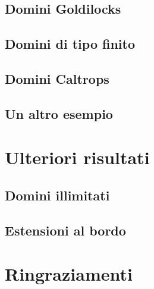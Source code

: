 \documentclass{article}
\begin{document}
\subsection{Domini Goldilocks}

\subsection{Domini di tipo finito}

\subsection{Domini Caltrops}

\subsection{Un altro esempio}


\newpage

\section{Ulteriori risultati} \label{Ulteriori risultati}
\subsection{Domini illimitati}

\subsection{Estensioni al bordo}


\newpage



\newpage

\section*{Ringraziamenti}

\end{document}
